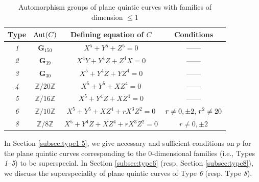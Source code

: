 \documentclass{article}
\theoremstyle{definition}
\begin{document}
\begin{table}[htbp]
    \centering
    \begin{tabular}{c||c|c|c}\hline
       Type & ${\rm Aut}(C)$ & Defining equation of $C$ & Conditions\\\hline
       \textit{1} & $\mathbf{G}_{150}$ & $X^5+Y^5+Z^5 = 0$ & ------\\[-0.2mm]
       \textit{2} & $\mathbf{G}_{39}$ & $X^4Y+Y^4Z+Z^4X = 0$ & ------\\[-0.2mm]
       \textit{3} & $\mathbf{G}_{30}$ & $X^5+Y^4Z+YZ^4 = 0$ & ------\\[-0.2mm]
       \textit{4} & $\mathbb{Z}/20\mathbb{Z}$ & $X^5+Y^5+XZ^4 = 0$ & ------\\[-0.2mm]
       \textit{5} & $\mathbb{Z}/16\mathbb{Z}$ & $X^5+Y^4Z+XZ^4 = 0$ & ------\\[-0.2mm]
       \textit{6} & $\mathbb{Z}/10\mathbb{Z}$ & $X^5+Y^5+XZ^4+rX^3Z^2 = 0$ & $r \neq 0,\pm 2, \hspace{0.5mm}r^2 \neq 20$\\[-0.2mm]
       \textit{8} & $\mathbb{Z}/8\mathbb{Z}$ & $X^5+Y^4Z+XZ^4+rX^3Z^2 = 0$ & $r \neq 0,\pm 2$\\\hline
    \end{tabular}\vspace{-0.7mm}
    \caption{Automorphism groups of plane quintic curves with families of dimension $\leq 1$}\label{tbl:classification}\vspace{0.7mm}
\end{table}
\noindent In Section \ref{subsec:type1-5}, we give necessary and sufficient conditions on $p$ for the plane quintic curves corresponding to the $0$-dimensional families (i.e., Types \hspace{-0.2mm}\textit{1}--\textit{5}\hspace{-0.2mm}) to be superspecial.
In Section \ref{subsec:type6} \hspace{0.2mm}(resp. Section \ref{subsec:type8}), we discuss the superspeciality of plane quintic curves of Type \hspace{-0.2mm}\textit{6} (resp. \hspace{-0.4mm}Type \hspace{-0.2mm}\textit{8}\hspace{-0.2mm}).

\setcounter{equation}{0}
\end{document}
